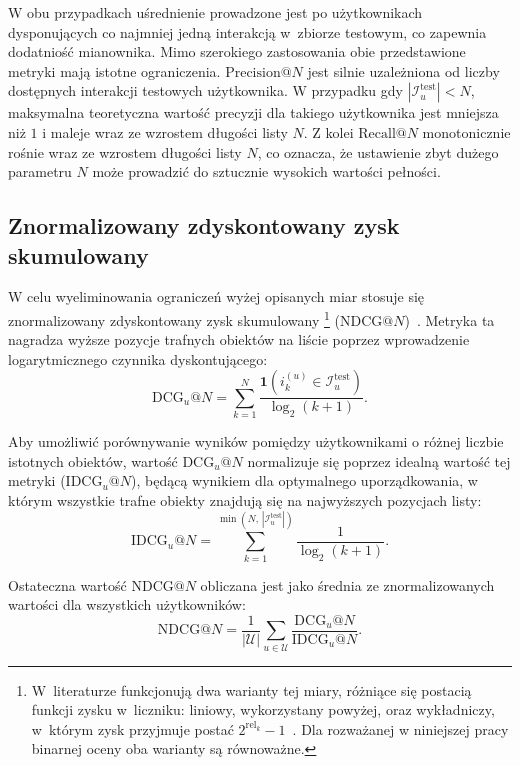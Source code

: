 W obu przypadkach uśrednienie prowadzone jest po użytkownikach dysponujących
co najmniej jedną interakcją w~zbiorze testowym, co zapewnia dodatniość
mianownika. Mimo szerokiego zastosowania obie przedstawione metryki mają istotne ograniczenia. $\text{Precision}@N$ jest silnie uzależniona od liczby dostępnych interakcji testowych użytkownika. W przypadku gdy $|\mathcal{I}_u^{\text{test}}| < N$, maksymalna teoretyczna wartość precyzji dla takiego użytkownika jest mniejsza niż $1$ i maleje wraz ze wzrostem długości listy $N$. Z kolei $\text{Recall}@N$ monotonicznie rośnie wraz ze wzrostem długości listy $N$, co oznacza, że ustawienie zbyt dużego parametru $N$ może prowadzić do sztucznie wysokich wartości pełności.

\subsection{Znormalizowany zdyskontowany zysk skumulowany}
\label{subsec:ndcg}

W celu wyeliminowania ograniczeń wyżej opisanych miar stosuje się znormalizowany zdyskontowany zysk skumulowany \footnote{W~literaturze funkcjonują dwa warianty tej miary, różniące się postacią funkcji zysku w~liczniku: liniowy, wykorzystany powyżej, oraz wykładniczy, w~którym zysk przyjmuje postać $2^{\mathrm{rel}_k}-1$~\cite{burges2005learning}. Dla rozważanej w niniejszej pracy binarnej oceny oba warianty są równoważne.} ($\text{NDCG}@N$)~\cite{aggarwal2016recommender}. Metryka ta nagradza wyższe pozycje trafnych obiektów na liście poprzez wprowadzenie logarytmicznego czynnika dyskontującego:
\begin{equation}
    \text{DCG}_u@N = \sum_{k=1}^{N} \frac{\mathbf{1}\left( i_k^{(u)} \in \mathcal{I}_u^{\text{test}} \right)}{\log_2(k + 1)}.
\end{equation}


Aby umożliwić porównywanie wyników pomiędzy użytkownikami o różnej liczbie istotnych obiektów, wartość $\text{DCG}_u@N$ normalizuje się poprzez idealną wartość tej metryki ($\text{IDCG}_u@N$), będącą wynikiem dla optymalnego uporządkowania, w którym wszystkie trafne obiekty znajdują się na najwyższych pozycjach listy:
\begin{equation}
    \text{IDCG}_u@N = \sum_{k=1}^{\min\left(N,\, |\mathcal{I}_u^{\text{test}}|\right)} \frac{1}{\log_2(k + 1)}.
\end{equation}

Ostateczna wartość $\text{NDCG}@N$ obliczana jest jako średnia ze znormalizowanych wartości dla wszystkich użytkowników:
\begin{equation}
    \text{NDCG}@N = \frac{1}{|\mathcal{U}|} \sum_{u \in \mathcal{U}} \frac{\text{DCG}_u@N}{\text{IDCG}_u@N}.
\end{equation}

